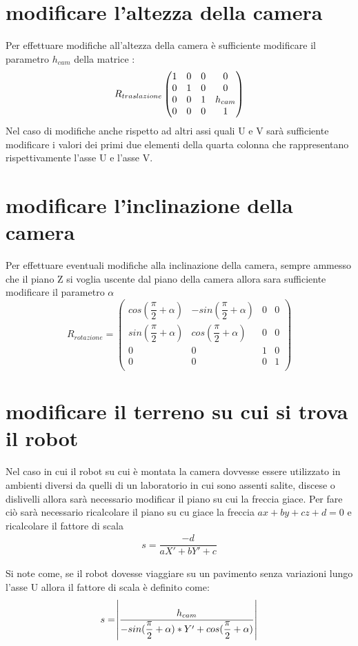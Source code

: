 \section{modificare l'altezza della camera}
Per effettuare modifiche all'altezza della camera è sufficiente modificare il parametro $h_{cam}$ della matrice :
\begin{equation}
	R_{traslazione}\\
	\begin{pmatrix}
	1 & 0 & 0 & 0 \\
	0 & 1 & 0 & 0 \\
	0 & 0 & 1 & h_{cam}\\
	0 & 0 & 0 & 1 \\
	\end{pmatrix}
\end{equation}
Nel caso di modifiche anche rispetto ad altri assi quali U e V sarà sufficiente modificare i valori dei primi due elementi della quarta colonna che rappresentano rispettivamente l'asse U e l'asse V.

\section{modificare l'inclinazione della camera}
Per effettuare eventuali modifiche alla inclinazione della camera, sempre ammesso che il piano Z si voglia uscente dal piano della camera allora sara sufficiente modificare il parametro $\alpha$
\begin{equation}
	R_{rotazione} =
	\begin{pmatrix}
		cos(\dfrac{\pi}{2}+\alpha) & -sin(\dfrac{\pi}{2}+\alpha) & 0 & 0 \\
		sin(\dfrac{\pi}{2}+\alpha) & cos(\dfrac{\pi}{2}+\alpha)& 0 & 0 \\
		0 & 0 & 1 & 0 \\
		0 & 0 & 0 & 1 \\
	\end{pmatrix}
\end{equation}

\section{modificare il terreno su cui si trova il robot}
Nel caso in cui il robot su cui è montata la camera dovvesse essere utilizzato in ambienti diversi da quelli di un laboratorio in cui sono assenti salite, discese o dislivelli allora sarà necessario modificar il piano su cui la freccia giace.
Per fare ciò sarà necessario ricalcolare il piano su cu giace la freccia $ax+by+cz+d=0$ e ricalcolare il fattore di scala
\begin{equation}
	\begin{split}
	s = \dfrac{-d}{aX'+bY'+c}	
	\end{split}
\end{equation}

Si note come, se il robot dovesse viaggiare su un pavimento senza variazioni lungo l'asse U allora il fattore di scala è definito come:
$$
s = \abs{\dfrac{h_{cam}
	}{-sin(\dfrac{\pi}{2}+\alpha)*Y'+ cos(\dfrac{\pi}{2}+\alpha)}}
$$